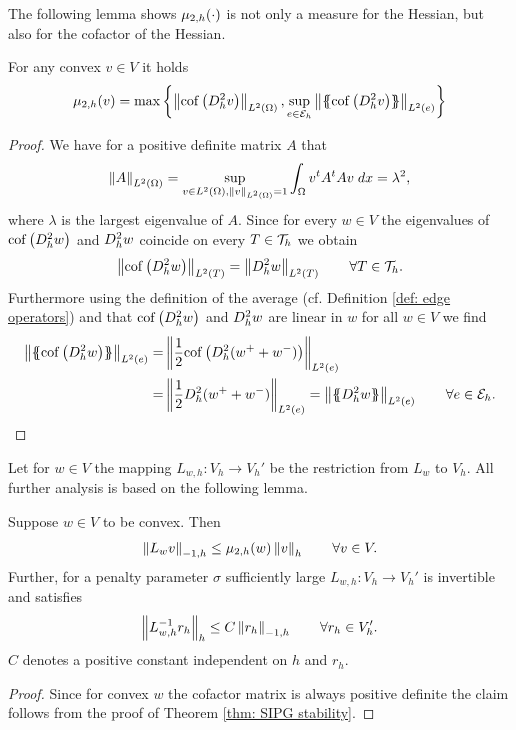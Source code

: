 The following lemma shows $\mu_{2,h}(\cdot)$ is not only a measure for the Hessian, but also for the cofactor of the Hessian.
\begin{lemma} \label{la: epsilon cof hess equal}
	For any convex $v \in V$ it holds
	\[
		\mu_{2,h}(v) = \operatorname{max} \left\{  \left\lVert \operatorname{cof} \left( D_h^2 v \right) \right\rVert_{L^2(\Omega)},  \sup_{e \in \mathcal{E}_h} \left\lVert \{\!\!\{ \operatorname{cof} \left( D_h^2 v \right) \}\!\!\} \right\rVert_{L^2(e)} \right\} 
	\]
\end{lemma}
\begin{proof}
	We have for a positive definite matrix $A$ that 
	\begin{align*}
	\left\lVert A \right\rVert_{L^2(\Omega)} =  \sup_{v \in L^2(\Omega), \left\lVert v \right\rVert_{L^2(\Omega)}=1} \int_{\Omega} {{v^t A^t A v}\;dx} = \lambda^2,
	\end{align*}
	where $\lambda$ is the largest eigenvalue of $A$. Since for every $w \in V$ the eigenvalues of $\operatorname{cof} \left( D_h^2 w \right)$ and $D_h^2 w$ coincide on every $T \in \mathcal{T}_h$ we obtain 
	\begin{align}
	\left\lVert \operatorname{cof} \left( D_h^2 w \right) \right\rVert_{L^2(T)} = \left\lVert D_h^2 w \right\rVert_{L^2(T)} \qquad \forall T \in \mathcal{T}_h.\label{eq: equality norm}
	\end{align}
	Furthermore using the definition of the average (cf. Definition \ref{def: edge operators}) and that $\operatorname{cof} \left( D_h^2 w \right)$ and $D_h^2 w$ are linear in $w$ for all $w \in V$ we find
	\begin{align}
	\LTwonormE{\average {\cofHessH{w}}} 
	=& \LTwonormE{\frac 1 2 {\cofHessH{(w^+ + w^-)}}} \nonumber\\
	=& \LTwonormE{\frac 1 2 {\hess{(w^+ + w^-)}}} 
	= \LTwonormE{\average {\hess{w}}} \qquad \forall e \in \edges. \label{eq: equality norm average}
	\end{align}
	\phantom{blub}
\end{proof}

Let for $w \in V$ the mapping $L_{w,h}:V_h \rightarrow V_h'$ be the restriction from $L_w$ to $V_h$. All further analysis is based on the following lemma.
\begin{lemma}[Stability] \label{la: stability L}
	Suppose $w \in V$ to be convex. Then 
	\begin{align}
		\left\lVert L_{w}v \right\rVert_{-1,h} \leq \mu_{2,h}(w) \left\lVert v \right\rVert_{h} \qquad \forall v \in V.
	\end{align}
	Further, for a penalty parameter $\sigma $ sufficiently large $L_{w,h}: V_h \rightarrow V_h'$ is invertible and satisfies
	\begin{align}
		\left\lVert L_{w,h}^{-1} r_h \right\rVert_{h} \leq C \left\lVert r_h \right\rVert_{-1,h} \qquad \forall r_h \in V_h'.
	\end{align}
	$C$ denotes a positive constant independent on $h$ and $r_h$. 
\end{lemma}
\begin{proof}
	Since for convex $w$ the cofactor matrix is always positive definite the claim follows from the proof of Theorem \ref{thm: SIPG stability}.
\end{proof}

